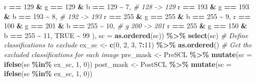 \documentclass[
]{article}
\newenvironment{Shaded}{\begin{snugshade}}{\end{snugshade}}
\newcommand{\AttributeTok}[1]{\textcolor[rgb]{0.13,0.29,0.53}{#1}}
\newcommand{\CommentTok}[1]{\textcolor[rgb]{0.56,0.35,0.01}{\textit{#1}}}
\newcommand{\ConstantTok}[1]{\textcolor[rgb]{0.56,0.35,0.01}{#1}}
\newcommand{\DecValTok}[1]{\textcolor[rgb]{0.00,0.00,0.81}{#1}}
\newcommand{\FunctionTok}[1]{\textcolor[rgb]{0.13,0.29,0.53}{\textbf{#1}}}
\newcommand{\NormalTok}[1]{#1}
\newcommand{\OtherTok}[1]{\textcolor[rgb]{0.56,0.35,0.01}{#1}}
\newcommand{\SpecialCharTok}[1]{\textcolor[rgb]{0.81,0.36,0.00}{\textbf{#1}}}
\begin{document}
\begin{Shaded}
\begin{Highlighting}[]
\NormalTok{            r }\SpecialCharTok{==} \DecValTok{129} \SpecialCharTok{\&}\NormalTok{ g }\SpecialCharTok{==} \DecValTok{129} \SpecialCharTok{\&}\NormalTok{ b }\SpecialCharTok{==} \DecValTok{129} \SpecialCharTok{\textasciitilde{}} \DecValTok{7}\NormalTok{,   }\CommentTok{\#  128 {-}\textgreater{} 129}
\NormalTok{            r }\SpecialCharTok{==} \DecValTok{193} \SpecialCharTok{\&}\NormalTok{ g }\SpecialCharTok{==} \DecValTok{193} \SpecialCharTok{\&}\NormalTok{ b }\SpecialCharTok{==} \DecValTok{193} \SpecialCharTok{\textasciitilde{}} \DecValTok{8}\NormalTok{,   }\CommentTok{\#  192 {-}\textgreater{} 193}
\NormalTok{            r }\SpecialCharTok{==} \DecValTok{255} \SpecialCharTok{\&}\NormalTok{ g }\SpecialCharTok{==} \DecValTok{255} \SpecialCharTok{\&}\NormalTok{ b }\SpecialCharTok{==} \DecValTok{255} \SpecialCharTok{\textasciitilde{}} \DecValTok{9}\NormalTok{, }
\NormalTok{            r }\SpecialCharTok{==} \DecValTok{100} \SpecialCharTok{\&}\NormalTok{ g }\SpecialCharTok{==} \DecValTok{201} \SpecialCharTok{\&}\NormalTok{ b }\SpecialCharTok{==} \DecValTok{255} \SpecialCharTok{\textasciitilde{}} \DecValTok{10}\NormalTok{,  }\CommentTok{\# g 200 {-}\textgreater{} 201}
\NormalTok{            r }\SpecialCharTok{==} \DecValTok{255} \SpecialCharTok{\&}\NormalTok{ g }\SpecialCharTok{==} \DecValTok{150} \SpecialCharTok{\&}\NormalTok{ b }\SpecialCharTok{==} \DecValTok{255} \SpecialCharTok{\textasciitilde{}} \DecValTok{11}\NormalTok{, }
            \ConstantTok{TRUE} \SpecialCharTok{\textasciitilde{}} \DecValTok{99}\NormalTok{ ), }
            \AttributeTok{sc =} \FunctionTok{as.ordered}\NormalTok{(sc)) }\SpecialCharTok{\%\textgreater{}\%}
          \FunctionTok{select}\NormalTok{(sc)}
        \CommentTok{\# Define classifications to exclude}
\NormalTok{          ex\_sc }\OtherTok{\textless{}{-}} \FunctionTok{c}\NormalTok{(}\DecValTok{0}\NormalTok{, }\DecValTok{2}\NormalTok{, }\DecValTok{3}\NormalTok{, }\DecValTok{7}\SpecialCharTok{:}\DecValTok{11}\NormalTok{) }\SpecialCharTok{\%\textgreater{}\%} \FunctionTok{as.ordered}\NormalTok{() }
        \CommentTok{\# Get the excluded classifications for each image}
\NormalTok{          pre\_mask }\OtherTok{\textless{}{-}} 
\NormalTok{            PreSCL }\SpecialCharTok{\%\textgreater{}\%}
            \FunctionTok{mutate}\NormalTok{(}\AttributeTok{sc =} \FunctionTok{ifelse}\NormalTok{(sc }\SpecialCharTok{\%in\%}\NormalTok{ ex\_sc, }\DecValTok{1}\NormalTok{, }\DecValTok{0}\NormalTok{)) }
\NormalTok{          post\_mask }\OtherTok{\textless{}{-}} 
\NormalTok{            PostSCL }\SpecialCharTok{\%\textgreater{}\%}
            \FunctionTok{mutate}\NormalTok{(}\AttributeTok{sc =} \FunctionTok{ifelse}\NormalTok{(sc }\SpecialCharTok{\%in\%}\NormalTok{ ex\_sc, }\DecValTok{1}\NormalTok{, }\DecValTok{0}\NormalTok{)) }
          

\end{Highlighting}
\end{Shaded}
\end{document}
